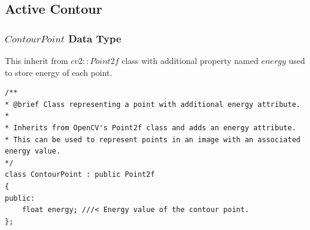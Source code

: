 \documentclass[12pt,a4paper]{report}
\begin{document}
\subsection{Active Contour}

\subsubsection{\(ContourPoint\) Data Type}
This inherit from \(cv2::Point2f\) class with additional property named \(energy\) used to store energy of each point.
\begin{lstlisting}
/**
* @brief Class representing a point with additional energy attribute.
*
* Inherits from OpenCV's Point2f class and adds an energy attribute.
* This can be used to represent points in an image with an associated energy value.
*/
class ContourPoint : public Point2f
{
public:
    float energy; ///< Energy value of the contour point.
};
\end{lstlisting}
\end{document}
